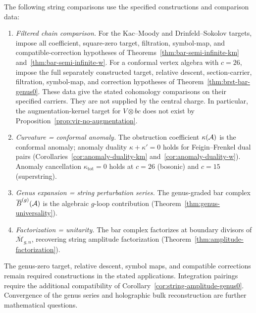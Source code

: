 \begin{theorem}\label{thm:algebraic-string-dictionary}
The following string comparisons use the specified constructions and comparison data:
\begin{enumerate}[label=\textup{(\roman*)}]
\item \emph{Filtered chain comparison.}
  For the Kac--Moody and Drinfeld--Sokolov targets, impose all coefficient, square-zero target, filtration, symbol-map, and compatible-correction hypotheses of Theorems~\ref{thm:bar-semi-infinite-km} and~\ref{thm:bar-semi-infinite-w}.
  For a conformal vertex algebra with $c=26$, impose the full separately constructed target, relative descent, section-carrier, filtration, symbol-map, and correction hypotheses of Theorem~\ref{thm:brst-bar-genus0}.
  These data give the stated cohomology comparisons on their specified carriers.
  They are not supplied by the central charge.
  In particular, the augmentation-kernel target for $V\otimes bc$ does not exist by Proposition~\ref{prop:vir-no-augmentation}.
\item \emph{Curvature = conformal anomaly.}
  The obstruction coefficient $\kappa(\mathcal{A})$ is the conformal
  anomaly; anomaly duality $\kappa + \kappa' = 0$ holds for
  Feigin--Frenkel dual pairs
  \textup{(}Corollaries~\textup{\ref{cor:anomaly-duality-km}}
  and~\textup{\ref{cor:anomaly-duality-w})}.
  Anomaly cancellation $\kappa_{\mathrm{tot}} = 0$ holds at
  $c = 26$ \textup{(}bosonic\textup{)} and $c = 15$
  \textup{(}superstring\textup{)}.
\item \emph{Genus expansion = string perturbation series.}
  The genus-graded bar complex
  $\overline{B}^{(g)}(\mathcal{A})$ is the algebraic $g$-loop
  contribution
  \textup{(}Theorem~\textup{\ref{thm:genus-universality})}.
\item \emph{Factorization = unitarity.}
  The bar complex factorizes at boundary divisors of
  $\overline{\mathcal{M}}_{g,n}$, recovering string amplitude
  factorization
  \textup{(}Theorem~\textup{\ref{thm:amplitude-factorization})}.
\end{enumerate}
The genus-zero target, relative descent, symbol maps, and compatible corrections remain required constructions in the stated applications.
Integration pairings require the additional compatibility of Corollary~\ref{cor:string-amplitude-genus0}.
Convergence of the genus series and holographic bulk reconstruction are further mathematical questions.
\end{theorem}

